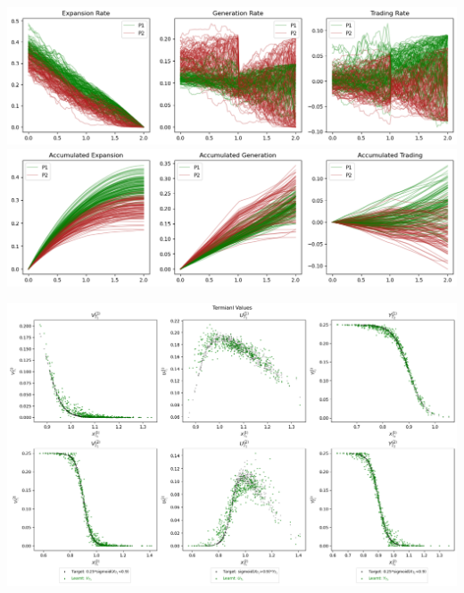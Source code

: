 \documentclass[a4paper,10pt]{article}
\newcommand{\1}{\mathbf{1}}
\begin{document}
\begin{center}
\begin{minipage}[ht]{0.9\textwidth} 
    \includegraphics{FinalReports/Illustration_diagrams/Joint-2A2P-Sigmoid-ResExamples/Rates.png}\\
    \includegraphics{FinalReports/Illustration_diagrams/Joint-2A2P-Sigmoid-ResExamples/AccumRates.png}\\
    \vspace*{-10pt}
    \label{fig:decomp-gen-jnt}
\end{minipage}
\end{center}  

\vfill

\begin{center}
\begin{minipage}[ht]{0.9\textwidth}
    \includegraphics{FinalReports/Illustration_diagrams/Joint-2A2P-Sigmoid-ResExamples/sigmoid_target.png}\\
    \vspace*{-10pt}
    \label{fig:terminal-values-jnt}
\end{minipage}    
\end{center}
\end{document}
